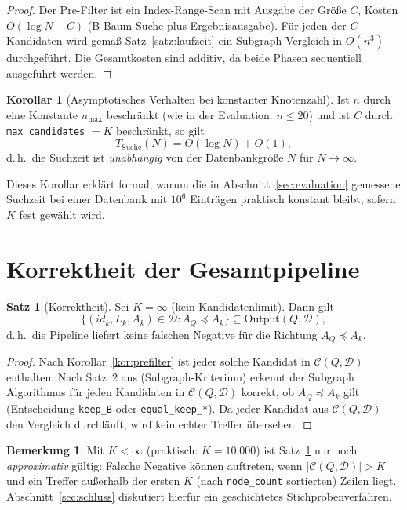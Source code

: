 \documentclass[a4paper,12pt, twoside]{report}
\theoremstyle{definition}
\newtheorem{satz}{Satz}
\newtheorem{bemerkung}{Bemerkung}
\newtheorem{korollar}{Korollar}
\begin{document}
\begin{proof}
	Der Pre-Filter ist ein Index-Range-Scan mit Ausgabe der Größe $C$, Kosten $O(\log N + C)$ (B-Baum-Suche plus Ergebnisausgabe). Für jeden der $C$ Kandidaten wird gemäß Satz~\ref{satz:laufzeit} ein Subgraph-Vergleich in $O(n^3)$ durchgeführt. Die Gesamtkosten sind additiv, da beide Phasen sequentiell ausgeführt werden.
\end{proof}

\begin{korollar}[Asymptotisches Verhalten bei konstanter Knotenzahl]
	Ist $n$ durch eine Konstante $n_{\max}$ beschränkt (wie in der Evaluation: $n \le 20$) und ist $C$ durch \texttt{max\_candidates} $= K$ beschränkt, so gilt
	\[
	T_{\text{Suche}}(N) = O(\log N) + O(1),
	\]
	d.\,h.\ die Suchzeit ist \emph{unabhängig} von der Datenbankgröße $N$ für $N \to \infty$.
\end{korollar}

Dieses Korollar erklärt formal, warum die in Abschnitt~\ref{sec:evaluation} gemessene Suchzeit bei einer Datenbank mit $10^6$ Einträgen praktisch konstant bleibt, sofern $K$ fest gewählt wird.

\section{Korrektheit der Gesamtpipeline}

\begin{satz}[Korrektheit]
	\label{satz:korrektheit}
	Sei $K = \infty$ (kein Kandidatenlimit). Dann gilt
	\[
	\{(id_k,L_k,A_k) \in \mathcal{D} : A_Q \preceq A_k\} \subseteq \mathrm{Output}(Q,\mathcal{D}),
	\]
	d.\,h.\ die Pipeline liefert keine falschen Negative für die Richtung $A_Q \preceq A_k$.
\end{satz}

\begin{proof}
	Nach Korollar~\ref{kor:prefilter} ist jeder solche Kandidat in $\mathcal{C}(Q,\mathcal{D})$ enthalten. Nach Satz~2 aus \cite{epp2026subgraph} (Subgraph-Kriterium) erkennt der Subgraph Algorithmus für jeden Kandidaten in $\mathcal{C}(Q,\mathcal{D})$ korrekt, ob $A_Q \preceq A_k$ gilt (Entscheidung \texttt{keep\_B} oder \texttt{equal\_keep\_*}). Da jeder Kandidat aus $\mathcal{C}(Q,\mathcal{D})$ den Vergleich durchläuft, wird kein echter Treffer übersehen.
\end{proof}

\begin{bemerkung}
	Mit $K < \infty$ (praktisch: $K = 10.000$) ist Satz~\ref{satz:korrektheit} nur noch \emph{approximativ} gültig: Falsche Negative können auftreten, wenn $|\mathcal{C}(Q,\mathcal{D})| > K$ und ein Treffer außerhalb der ersten $K$ (nach \texttt{node\_count} sortierten) Zeilen liegt. Abschnitt~\ref{sec:schluss} diskutiert hierfür ein geschichtetes Stichprobenverfahren.
\end{bemerkung}
\end{document}
